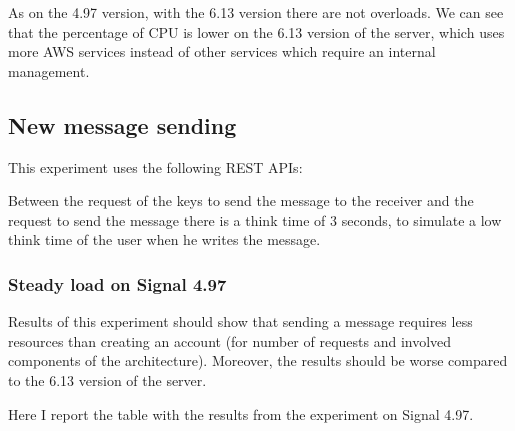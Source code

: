 As on the 4.97 version, with the 6.13 version there are not overloads.
We can see that the percentage of CPU is lower on the 6.13 version of the server, which uses more AWS services instead of other services which require an internal management.

\subsection{New message sending\label{sec:newmessage}}

This experiment uses the following REST APIs:

\begin{table}[H]
\caption{Sequence of calls to send a message}
\label{tab:apimessage}
\end{table}

Between the request of the keys to send the message to the receiver and the request to send the message there is a think time of $3$ seconds, to simulate a low think time of the user when he writes the message.

\clearpage

\subsubsection{Steady load on Signal 4.97}

Results of this experiment should show that sending a message requires less resources than creating an account (for number of requests and involved components of the architecture).
Moreover, the results should be worse compared to the 6.13 version of the server.

Here I report the table with the results from the experiment on Signal 4.97.

